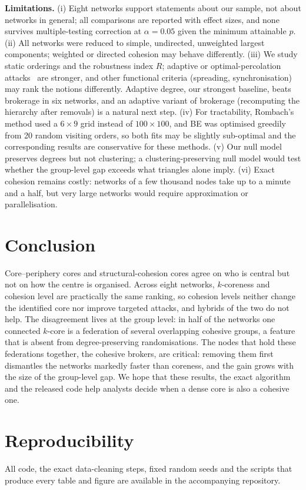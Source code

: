 \documentclass[conference]{IEEEtran}
\begin{document}
\textbf{Limitations.} (i) Eight networks support statements about our sample, not about networks in
general; all comparisons are reported with effect sizes, and none survives multiple-testing correction at
$\alpha=0.05$ given the minimum attainable $p$. (ii) All networks were reduced to simple, undirected,
unweighted largest components; weighted or directed cohesion may behave differently. (iii) We study
static orderings and the robustness index $R$; adaptive or optimal-percolation
attacks~\cite{morone2015influence} are stronger, and other functional criteria (spreading, synchronisation)
may rank the notions differently. Adaptive degree, our strongest baseline, beats brokerage in six
networks, and an adaptive variant of brokerage (recomputing the hierarchy after removals) is a natural
next step. (iv) For tractability, Rombach's method used a $6\times9$ grid instead of $100\times100$, and BE
was optimised greedily from 20 random visiting orders, so both fits may be slightly sub-optimal and the
corresponding results are conservative for these methods. (v) Our null model preserves degrees but not clustering; a clustering-preserving null
model would test whether the group-level gap exceeds what triangles alone imply. (vi) Exact cohesion
remains costly: networks of a few thousand nodes take up to a minute and a half, but very large
networks would require approximation or parallelisation.

\section{Conclusion}
Core--periphery cores and structural-cohesion cores agree on who is central but not on how the centre is
organised. Across eight networks, $k$-coreness and cohesion level are practically the same ranking, so
cohesion levels neither change the identified core nor improve targeted attacks, and hybrids of the two
do not help. The disagreement lives at the group level: in half of the networks one connected $k$-core
is a federation of several overlapping cohesive groups, a feature that is absent from degree-preserving
randomisations. The nodes that hold these federations together, the cohesive brokers, are critical:
removing them first dismantles the networks markedly faster than coreness, and the gain grows with the size
of the group-level gap. We hope that these results, the exact algorithm and the released code help
analysts decide when a dense core is also a cohesive one.

\section*{Reproducibility}
All code, the exact data-cleaning steps, fixed random seeds and the scripts that produce every
table and figure are available in the accompanying repository.



\end{document}
